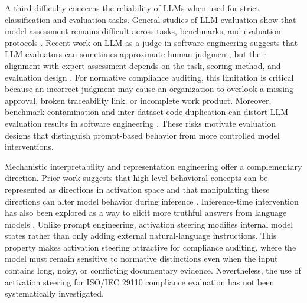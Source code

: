 \documentclass{ieeeaccess}
\begin{document}
A third difficulty concerns the reliability of LLMs when used for strict classification and evaluation tasks. General studies of LLM evaluation show that model assessment remains difficult across tasks, benchmarks, and evaluation protocols \cite{asoeollm}. Recent work on LLM-as-a-judge in software engineering suggests that LLM evaluators can sometimes approximate human judgment, but their alignment with expert assessment depends on the task, scoring method, and evaluation design \cite{cllmrheaesllmis, ICLR2025_7f8f7313}. For normative compliance auditing, this limitation is critical because an incorrect judgment may cause an organization to overlook a missing approval, broken traceability link, or incomplete work product. Moreover, benchmark contamination and inter-dataset code duplication can distort LLM evaluation results in software engineering \cite{hernandez2024codeduplication, zhou2025lessleak}. These risks motivate evaluation designs that distinguish prompt-based behavior from more controlled model interventions.

Mechanistic interpretability and representation engineering offer a complementary direction. Prior work suggests that high-level behavioral concepts can be represented as directions in activation space and that manipulating these directions can alter model behavior during inference \cite{zou2023representation, turner2023activation}. Inference-time intervention has also been explored as a way to elicit more truthful answers from language models \cite{li2023iti}. Unlike prompt engineering, activation steering modifies internal model states rather than only adding external natural-language instructions. This property makes activation steering attractive for compliance auditing, where the model must remain sensitive to normative distinctions even when the input contains long, noisy, or conflicting documentary evidence. Nevertheless, the use of activation steering for ISO/IEC 29110 compliance evaluation has not been systematically investigated.
\end{document}
